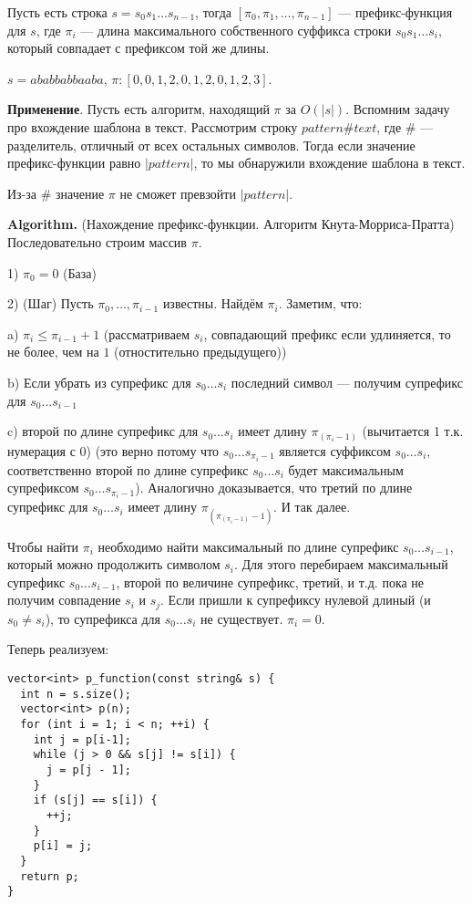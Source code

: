 \Def Пусть есть строка $s = s_0 s_1 \dots s_{n - 1}$,  тогда $[\pi_0, \pi_1, \dots, \pi_{n-1}]$ — префикс-функция для $s$, где $\pi_i$ — длина максимального собственного суффикса строки $s_0 s_1 \dots s_i$, который совпадает с префиксом той же длины.

\Example $s = ababbabbaaba$, $\pi: [0, 0, 1, 2, 0, 1, 2, 0, 1, 2, 3]$.

\textbf{Применение}. Пусть есть алгоритм, находящий $\pi$ за $O(|s|)$. Вспомним задачу про вхождение шаблона в текст. Рассмотрим строку $pattern \# text$, где $\#$ — разделитель, отличный от всех остальных символов. Тогда если значение префикс-функции равно $|pattern|$, то мы обнаружили вхождение шаблона в текст.

\Note Из-за $\#$ значение $\pi$ не сможет превзойти $|pattern|$.

\textbf{Algorithm.} (Нахождение префикс-функции. Алгоритм Кнута-Морриса-Пратта) 
Последовательно строим массив $\pi$.

1) $\pi_0 = 0$ (База) 

2) (Шаг) Пусть $\pi_0, \dots, \pi_{i-1}$ известны. Найдём $\pi_i$. Заметим, что:

a) $\pi_i \leqslant \pi_{i-1} + 1$ (рассматриваем $s_i$, совпадающий префикс если удлиняется, то не более, чем на $1$ (отностительно предыдущего))

b) Если убрать из супрефикс для $s_0 \dots s_i$ последний символ — получим супрефикс для $s_0 \dots s_{i-1}$

c) второй по длине супрефикс для $s_0 \dots s_{i}$ имеет длину $\pi_{(\pi_{i} - 1)}$ (вычитается 1 т.к. нумерация с 0) (это верно потому что $s_0 \dots s_{\pi_{i} - 1}$ является суффиксом $s_0 \dots s_i$, соответственно второй по длине супрефикс $s_0 \dots s_{i}$ будет максимальным супрефиксом $s_0 \dots s_{\pi_{i} - 1}$). Аналогично доказывается, что третий по длине супрефикс для $s_0 \dots s_{i}$ имеет длину $\pi_{(\pi_{(\pi_{i} - 1)} - 1)}$. И так далее.

Чтобы найти $\pi_{i}$ необходимо найти максимальный по длине супрефикс $s_0 \dots s_{i-1}$, который можно продолжить символом $s_i$. Для этого перебираем максимальный супрефикс $s_0 \dots s_{i-1}$, второй по величине супрефикс, третий, и т.д. пока не получим совпадение $s_i$ и $s_j$. Если пришли к супрефиксу нулевой длиный (и $s_0 \not= s_i$), то супрефикса для $s_0 \dots s_{i}$ не существует. $\pi_i = 0$.

Теперь реализуем:

\begin{lstlisting}
vector<int> p_function(const string& s) {
  int n = s.size();
  vector<int> p(n);
  for (int i = 1; i < n; ++i) {
    int j = p[i-1];
    while (j > 0 && s[j] != s[i]) {
      j = p[j - 1];
    }
    if (s[j] == s[i]) {
      ++j;
    }
    p[i] = j;
  }
  return p;
}
\end{lstlisting}

